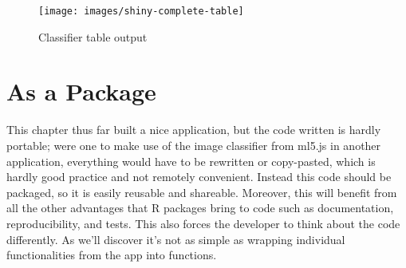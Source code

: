 \documentclass[10pt,]{krantz}
\makeatletter
\newenvironment{Shaded}{\begin{snugshade}}{\end{snugshade}}
\newcommand{\DataTypeTok}[1]{\textcolor[rgb]{0.27,0.27,0.27}{#1}}
\newcommand{\KeywordTok}[1]{\textcolor[rgb]{0.27,0.27,0.27}{\textbf{#1}}}
\newcommand{\NormalTok}[1]{#1}
\newcommand{\OperatorTok}[1]{\textcolor[rgb]{0.43,0.43,0.43}{\textbf{#1}}}
\newcommand{\StringTok}[1]{\textcolor[rgb]{0.5,0.5,0.5}{#1}}
\newenvironment{kframe}{%
\medskip{}
\setlength{\fboxsep}{.8em}
 \def\at@end@of@kframe{}%
 \ifinner\ifhmode%
  \def\at@end@of@kframe{\end{minipage}}%
  \begin{minipage}{\columnwidth}%
 \fi\fi%
 \def\FrameCommand##1{\hskip\@totalleftmargin \hskip-\fboxsep
 \colorbox{shadecolor}{##1}\hskip-\fboxsep
     \hskip-\linewidth \hskip-\@totalleftmargin \hskip\columnwidth}%
 \MakeFramed {\advance\hsize-\width
   \@totalleftmargin\z@ \linewidth\hsize
   \@setminipage}}%
 {\par\unskip\endMakeFramed%
 \at@end@of@kframe}
\renewenvironment{Shaded}{\begin{kframe}}{\end{kframe}}
\makeatother
\begin{document}
\begin{Shaded}
\end{Shaded}

\begin{figure}[H]

{\centering \texttt{[image: images/shiny-complete-table]} 

}

\caption{Classifier table output}\label{fig:shiny-complete-table-output}
\end{figure}

\hypertarget{shiny-complete-pkg}{%
\section{As a Package}\label{shiny-complete-pkg}}

This chapter thus far built a nice application, but the code written is hardly portable; were one to make use of the image classifier from ml5.js in another application, everything would have to be rewritten or copy-pasted, which is hardly good practice and not remotely convenient. Instead this code should be packaged, so it is easily reusable and shareable. Moreover, this will benefit from all the other advantages that R packages bring to code such as documentation, reproducibility, and tests. This also forces the developer to think about the code differently. As we'll discover it's not as simple as wrapping individual functionalities from the app into functions.
\end{document}
